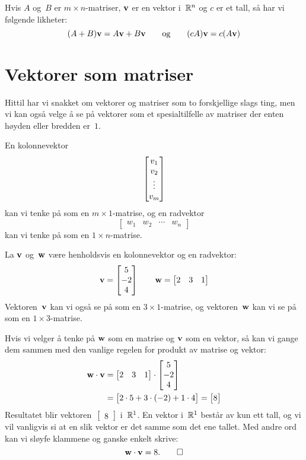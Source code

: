 
\begin{thm}
Hvis $A$ og~$B$ er $m \times n$-matriser, $\mathbf{v}$ er en vektor
i~$\mathbb{R}^n$ og $c$ er et tall, så har vi følgende likheter:
\[
(A + B) \mathbf{v} = A \mathbf{v} + B \mathbf{v}
\qquad\text{og}\qquad
(c A) \mathbf{v} = c (A \mathbf{v})
\]
\end{thm}


\section*{Vektorer som matriser}

Hittil har vi snakket om vektorer og matriser som to forskjellige
slags ting, men vi kan også velge å se på vektorer som et
spesialtilfelle av matriser der enten høyden eller bredden er~$1$.

En kolonnevektor
\[
\begin{bmatrix} v_1 \\ v_2 \\ \vdots \\ v_m \end{bmatrix}
\]
kan vi tenke på som en $m \times 1$-matrise, og en radvektor
\[
\begin{bmatrix} w_1 & w_2 & \cdots & w_n \end{bmatrix}
\]
kan vi tenke på som en $1 \times n$-matrise.

\begin{ex}
La $\mathbf{v}$ og~$\mathbf{w}$ være henholdsvis en kolonnevektor og en
radvektor:
\[
\mathbf{v} = \begin{bmatrix} 5 \\ -2 \\ 4 \end{bmatrix}
\qquad
\mathbf{w} = \begin{bmatrix} 2 & 3 & 1 \end{bmatrix}
\]
Vektoren~$\mathbf{v}$ kan vi også se på som en $3 \times 1$-matrise, og
vektoren~$\mathbf{w}$ kan vi se på som en $1 \times 3$-matrise.

Hvis vi velger å tenke på $\mathbf{w}$ som en matrise og $\mathbf{v}$ som en
vektor, så kan vi gange dem sammen med den vanlige regelen for produkt
av matrise og vektor:
\begin{align*}
\mathbf{w} \cdot \mathbf{v}
&= \begin{bmatrix} 2 & 3 & 1 \end{bmatrix} \cdot \begin{bmatrix} 5 \\ -2 \\ 4 \end{bmatrix} \\
&= \begin{bmatrix} 2 \cdot 5 + 3 \cdot (-2) + 1 \cdot 4 \end{bmatrix}
 = \begin{bmatrix} 8 \end{bmatrix}
\end{align*}
Resultatet blir vektoren~$\begin{bmatrix} 8 \end{bmatrix}$ i~$\mathbb{R}^1$.
En vektor i~$\mathbb{R}^1$ består av kun ett tall, og vi vil vanligvis si at
en slik vektor er det samme som det ene tallet.  Med andre ord kan vi
sløyfe klammene og ganske enkelt skrive:
\[
\mathbf{w} \cdot \mathbf{v} = 8.\qedhere
\]
\end{ex}

